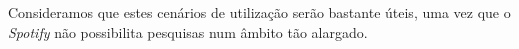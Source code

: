 \documentclass[twocolumn,twoside,11pt,a4paper]{article}
\begin{document}
Consideramos que estes cenários de utilização serão bastante úteis, uma vez que o
\textit{Spotify} não possibilita pesquisas num âmbito tão alargado.


% 

%
%


\end{document}
